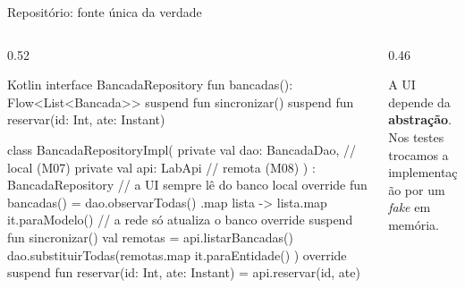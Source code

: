 \documentclass[aspectratio=169,10pt]{beamer}
\begin{document}
\begin{frame}[fragile]{Repositório: fonte única da verdade}
  \begin{columns}[T]
    \begin{column}{0.52\textwidth}
\begin{codigo}[title=BancadaRepository.kt]{Kotlin}
interface BancadaRepository {
  fun bancadas(): Flow<List<Bancada>>
  suspend fun sincronizar()
  suspend fun reservar(id: Int, ate: Instant)
}

class BancadaRepositoryImpl(
  private val dao: BancadaDao,        // local (M07)
  private val api: LabApi             // remota (M08)
) : BancadaRepository {
  // a UI sempre lê do banco local
  override fun bancadas() = dao.observarTodas()
    .map { lista -> lista.map { it.paraModelo() } }
  // a rede só atualiza o banco
  override suspend fun sincronizar() {
    val remotas = api.listarBancadas()
    dao.substituirTodas(remotas.map { it.paraEntidade() })
  }
  override suspend fun reservar(id: Int, ate: Instant) =
    api.reservar(id, ate)
}
\end{codigo}
    \end{column}
    \begin{column}{0.46\textwidth}
      \centering
      \begin{conceito}
        A UI depende da \textbf{abstração}. Nos testes trocamos a implementação por um \emph{fake} em memória.
      \end{conceito}
    \end{column}
  \end{columns}
\end{frame}
\end{document}
